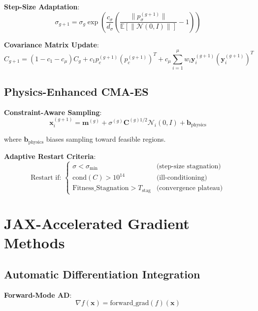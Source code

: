 \documentclass[11pt,a4paper]{article}
\begin{document}
\textbf{Step-Size Adaptation}:
\begin{equation}
\sigma_{g+1} = \sigma_g \exp\left(\frac{c_\sigma}{d_\sigma} \left(\frac{\|p_\sigma^{(g+1)}\|}{\mathbb{E}[\|\mathcal{N}(0,I)\|]} - 1\right)\right)
\end{equation}

\textbf{Covariance Matrix Update}:
\begin{equation}
C_{g+1} = (1 - c_1 - c_\mu) C_g + c_1 p_c^{(g+1)} (p_c^{(g+1)})^T + c_\mu \sum_{i=1}^\mu w_i \mathbf{y}_i^{(g+1)} (\mathbf{y}_i^{(g+1)})^T
\end{equation}

\subsection{Physics-Enhanced CMA-ES}

\textbf{Constraint-Aware Sampling}:
\begin{equation}
\mathbf{x}_i^{(g+1)} = \mathbf{m}^{(g)} + \sigma^{(g)} \mathbf{C}^{(g)1/2} \mathcal{N}_i(0, I) + \mathbf{b}_{\text{physics}}
\end{equation}

where $\mathbf{b}_{\text{physics}}$ biases sampling toward feasible regions.

\textbf{Adaptive Restart Criteria}:
\begin{equation}
\text{Restart if: } \begin{cases}
\sigma < \sigma_{\min} & \text{(step-size stagnation)} \\
\text{cond}(C) > 10^{14} & \text{(ill-conditioning)} \\
\text{Fitness\_Stagnation} > T_{\text{stag}} & \text{(convergence plateau)}
\end{cases}
\end{equation}

\section{JAX-Accelerated Gradient Methods}

\subsection{Automatic Differentiation Integration}

\textbf{Forward-Mode AD}:
\begin{equation}
\nabla f(\mathbf{x}) = \text{forward\_grad}(f)(\mathbf{x})
\end{equation}
\end{document}
